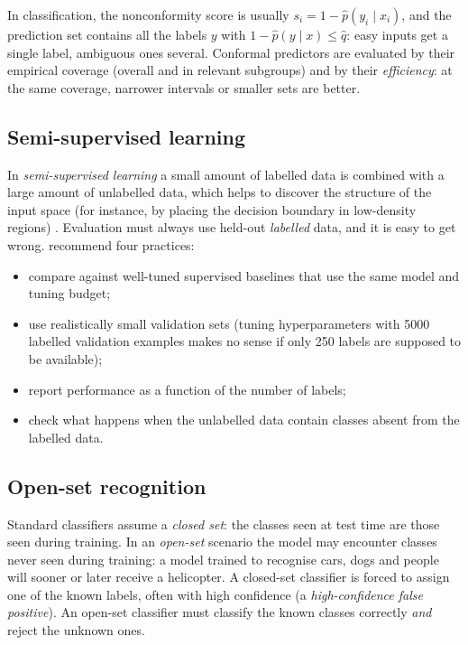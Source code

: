 In classification, the nonconformity score is usually $s_i=1-\hat p(y_i\mid x_i)$, and the
prediction set contains all the labels $y$ with $1-\hat p(y\mid x)\leq\hat q$: easy inputs get a
single label, ambiguous ones several. Conformal predictors are evaluated by their empirical
coverage (overall and in relevant subgroups) and by their \emph{efficiency}: at the same
coverage, narrower intervals or smaller sets are better.

\subsection{Semi-supervised learning}

In \emph{semi-supervised learning} a small amount of labelled data is combined with a large
amount of unlabelled data, which helps to discover the structure of the input space (for
instance, by placing the decision boundary in low-density regions) \citep{vanengelen2020survey}.
Evaluation must always use held-out \emph{labelled} data, and it is easy to get wrong.
\citet{oliver2018realistic} recommend four practices:
\begin{itemize}
\item compare against well-tuned supervised baselines that
use the same model and tuning budget; \item use realistically small validation sets (tuning
hyperparameters with 5000 labelled validation examples makes no sense if only 250 labels are
supposed to be available); \item report performance as a function of the number of labels; \item check what happens when the unlabelled data contain classes absent from the labelled data.
\end{itemize}

\subsection{Open-set recognition}

Standard classifiers assume a \emph{closed set}: the classes seen at test time are those seen
during training. In an \emph{open-set} scenario \citep{scheirer2013toward} the model may
encounter classes never seen during training: a model trained to recognise cars, dogs and
people will sooner or later receive a helicopter. A closed-set classifier is forced to assign
one of the known labels, often with high confidence (a \emph{high-confidence false
positive}). An open-set classifier must classify the known classes correctly \emph{and} reject
the unknown ones.

